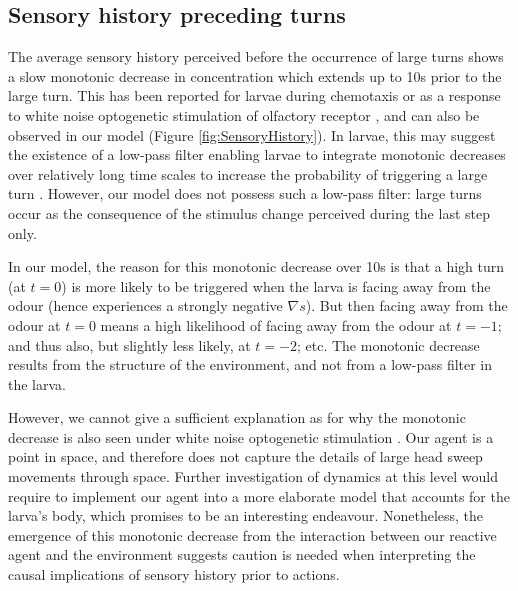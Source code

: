 \documentclass[11pt,a4paper]{article}
\newcommand{\todoML}[1]{\todo[author=ML,color=white, size=\tiny,inline]{#1}}
\begin{document}
\subsection{Sensory history preceding turns}
The average sensory history perceived before the occurrence of large turns shows a slow monotonic decrease in concentration which extends up to 10s prior to the large turn. This has been reported for larvae during chemotaxis \citep{gomez2011active} or as a response to white noise optogenetic stimulation of olfactory receptor \citep{gepner2015computations}, and can also be observed in our model (Figure \ref{fig:SensoryHistory}).
  In larvae, this may suggest the existence of a low-pass filter enabling larvae to integrate monotonic decreases over relatively long time scales to increase the probability of triggering a large turn \citep{gomez2011active,davies2015model,gepner2015computations}. However, our model does not possess such a low-pass filter: large turns occur as the consequence of the stimulus change perceived during the last step only.

 In our model, the reason for this monotonic decrease over 10s is that a high turn (at $t=0$) is more likely to be triggered when the larva is facing away from the odour (hence experiences a strongly negative $\nabla s$). But then facing away from the odour at $t=0$ means a high likelihood of facing away from the odour at $t=-1$; and thus also, but slightly less likely, at $t=-2$; etc. The monotonic decrease results from the structure of the environment, and not from a low-pass filter in the larva. 
 
  However, we cannot give a sufficient explanation as for why the monotonic decrease is also seen under white noise optogenetic stimulation \cite{gepner2015computations}.
   Our agent is a point in space, and therefore does not capture the details of large head sweep movements through space. Further investigation of dynamics at this level would require to implement our agent into a more elaborate  model that accounts for the larva's body, which promises to be an interesting endeavour. Nonetheless, the emergence of this monotonic decrease from the interaction between our reactive agent and the environment suggests caution is needed when interpreting the causal implications of sensory history prior to actions.
\end{document}
